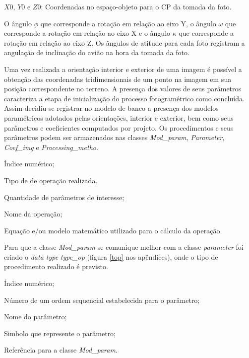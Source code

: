 $X0$, $Y0$ e $Z0$: Coordenadas no espaço-objeto para o CP da tomada da foto.

O ângulo $\phi$ que corresponde a rotação em relação ao eixo Y, o ângulo $\omega$ que corresponde a rotação em relação ao eixo X e o ângulo $\kappa$ que corresponde a rotação em relação ao eixo Z. Os ângulos de atitude para cada foto registram a angulação de inclinação do avião na hora da tomada da foto.

Uma vez realizada a orientação interior e exterior de uma imagem é possível a obtenção das coordenadas tridimensionais de um ponto na imagem em sua posição correspondente no terreno. A presença dos valores de seus parâmetros caracteriza a etapa de inicialização do processo fotogramétrico como concluída. Assim decidiu-se registrar no modelo de banco a presença dos modelos paramétricos adotados pelas orientações, interior e exterior, bem como seus parâmetros e coeficientes computados por projeto. Os procedimentos e seus parâmetros podem ser armazenados nas classes \textit{Mod\_param}, \textit{Parameter}, \textit{Coef\_img} e \textit{Processing\_metho}.

\begin{description}[labelwidth=2cm, itemsep=-0.3cm]
\item [Classe Mod\_param]
\item[Id:] Índice numérico;
\item[Type:]  Tipo de de operação realizada.
\item[Num\_par:] Quantidade de parâmetros de interesse;
\item[Name:] Nome da operação;
\item[Formula:] Equação e/ou modelo matemático utilizado para o cálculo da operação.
\end{description}

Para que a classe \textit{Mod\_param} se comunique melhor com a classe  \textit{parameter} foi criado o \textit{data type} \textit{type\_op} (figura \ref{top} nos apêndices), onde o tipo de procedimento realizado é previsto.

\begin{description}[labelwidth=2cm, itemsep=-0.3cm]
\item [Classe Parameter]
\item[Id:] Índice numérico;
\item[Sequential:] Número de um ordem sequencial estabelecida para o parâmetro;
\item[Name:] Nome do parâmetro;
\item[Symbol:] Simbolo que represente o parâmetro;
\item[Id\_mpar:] Referência para a classe \textit{Mod\_param}.
\end{description}

